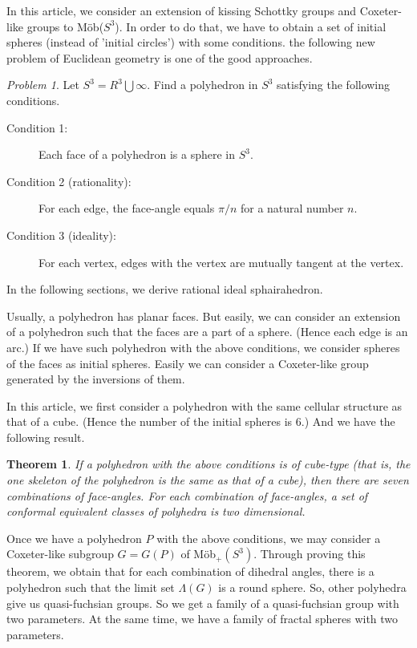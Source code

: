 \documentclass[suppldata, dvipdfmx]{interact}
\theoremstyle{plain}%
\newtheorem{theorem}{Theorem}[section]
\theoremstyle{definition}
\theoremstyle{remark}
\theoremstyle{problemstyle}
\newtheorem{problem}{Problem}[section] %
\begin{document}
In this article, we consider an extension of kissing Schottky groups and
Coxeter-like groups to M\"ob($S^3$). In order to do that, we have to
obtain a set of initial spheres (instead of 'initial circles') with some
conditions. the following new problem of Euclidean geometry is
one of the good approaches.

\begin{problem}
 Let $S^3 = R^3 \bigcup {\infty}$. Find a polyhedron in $S^3$ satisfying
 the following conditions.
 \begin{description}
  \item[Condition 1:] Each face of a polyhedron is a sphere in $S^3$.
  \item[Condition 2 (rationality):] For each edge, the face-angle equals $\pi/n$
             for a natural number $n$.
  \item[Condition 3 (ideality):] For each vertex, edges with the vertex are
             mutually tangent at the vertex.
 \end{description}
\end{problem}

In the following sections, we derive rational ideal sphairahedron.

Usually, a polyhedron has planar faces. But easily, we can consider an
extension of a polyhedron such that the faces are a part of a
sphere. (Hence each edge is an arc.) If we have such polyhedron with
the above conditions, we consider spheres of the faces as initial
spheres. Easily we can consider a Coxeter-like group generated by the
inversions of them.

In this article, we first consider a polyhedron with the same cellular
structure as that of a cube. (Hence the number of the initial spheres is
6.) And we have the following result.

\begin{theorem}\label{main}
 If a polyhedron with the above conditions is of cube-type (that is,
 the one skeleton of the polyhedron is the same as that of a cube), then
 there are seven combinations of face-angles. For each combination of
 face-angles, a set of conformal equivalent classes of polyhedra is two
 dimensional.
\end{theorem}

Once we have a polyhedron $P$ with the above conditions, we may consider
a Coxeter-like subgroup $G=G(P)$ of M\"ob$_+(S^3)$. Through proving this
theorem, we obtain that for each combination of dihedral angles, there is a
polyhedron such that the limit set $\Lambda(G)$ is a round sphere. So,
other polyhedra give us quasi-fuchsian groups. So we get a family of
a quasi-fuchsian group with two parameters. At the same time, we have a
family of fractal spheres with two parameters.
\end{document}
